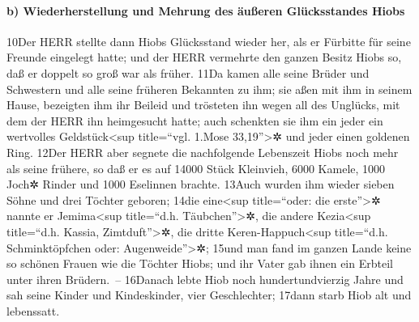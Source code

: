 \hypertarget{b-wiederherstellung-und-mehrung-des-uxe4uuxdferen-gluxfccksstandes-hiobs}{%
\paragraph{b) Wiederherstellung und Mehrung des äußeren Glücksstandes
Hiobs}\label{b-wiederherstellung-und-mehrung-des-uxe4uuxdferen-gluxfccksstandes-hiobs}}

10Der HERR stellte dann Hiobs Glücksstand wieder her, als er Fürbitte
für seine Freunde eingelegt hatte; und der HERR vermehrte den ganzen
Besitz Hiobs so, daß er doppelt so groß war als früher. 11Da kamen alle
seine Brüder und Schwestern und alle seine früheren Bekannten zu ihm;
sie aßen mit ihm in seinem Hause, bezeigten ihm ihr Beileid und
trösteten ihn wegen all des Unglücks, mit dem der HERR ihn heimgesucht
hatte; auch schenkten sie ihm ein jeder ein wertvolles
Geldstück\textless sup title=``vgl. 1.Mose 33,19''\textgreater✲ und
jeder einen goldenen Ring. 12Der HERR aber segnete die nachfolgende
Lebenszeit Hiobs noch mehr als seine frühere, so daß er es auf 14000
Stück Kleinvieh, 6000 Kamele, 1000 Joch✲ Rinder und 1000 Eselinnen
brachte. 13Auch wurden ihm wieder sieben Söhne und drei Töchter geboren;
14die eine\textless sup title=``oder: die erste''\textgreater✲ nannte er
Jemima\textless sup title=``d.h. Täubchen''\textgreater✲, die andere
Kezia\textless sup title=``d.h. Kassia, Zimtduft''\textgreater✲, die
dritte Keren-Happuch\textless sup title=``d.h. Schminktöpfchen oder:
Augenweide''\textgreater✲; 15und man fand im ganzen Lande keine so
schönen Frauen wie die Töchter Hiobs; und ihr Vater gab ihnen ein
Erbteil unter ihren Brüdern.~-- 16Danach lebte Hiob noch
hundertundvierzig Jahre und sah seine Kinder und Kindeskinder, vier
Geschlechter; 17dann starb Hiob alt und lebenssatt.
